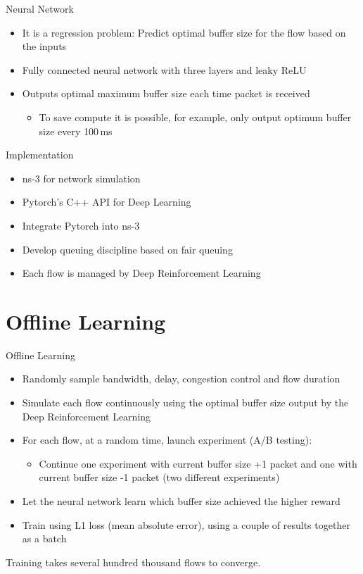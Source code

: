 \documentclass[xcolor={dvipsnames}]{beamer}
\begin{document}
\begin{frame}{Neural Network}
\begin{itemize}
\item It is a regression problem: Predict optimal buffer size for the flow based on the inputs
\item Fully connected neural network with three layers and leaky ReLU
\item Outputs optimal maximum buffer size each time packet is received
\begin{itemize}
\item To save compute it is possible, for example, only output optimum buffer size every 100\,ms
\end{itemize}
\end{itemize}
\end{frame}

\begin{frame}{Implementation}
\begin{itemize}
\item ns-3 for network simulation
\item Pytorch's C++ API for Deep Learning
\item Integrate Pytorch into ns-3
\item Develop queuing discipline based on fair queuing
\item Each flow is managed by Deep Reinforcement Learning
\end{itemize}
\end{frame}

\section{Offline Learning}
\begin{frame}{Offline Learning}
\begin{itemize}
\item Randomly sample bandwidth, delay, congestion control and flow duration
\item Simulate each flow continuously using the optimal buffer size output by the Deep Reinforcement Learning
\item For each flow, at a random time, launch experiment (A/B testing):
\begin{itemize}
\item Continue one experiment with current buffer size +1 packet and one with current buffer size -1 packet (two different experiments)
\end{itemize}
\item Let the neural network learn which buffer size achieved the higher reward
\item Train using L1 loss (mean absolute error), using a couple of results together as a batch
\end{itemize}
Training takes several hundred thousand flows to converge. 
\end{frame}
\end{document}
